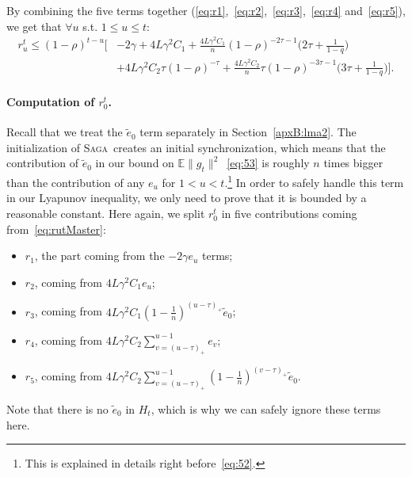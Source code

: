 \documentclass[twoside]{article}
\newcommand{\stepsize}{\gamma}
\newcommand{\overlap}{\tau}
\newcommand{\contraction}{\rho}
\newcommand{\lipschitz}{L}
\newcommand{\E}{\mathbb{E}}
\newcommand{\SAGA}{\textsc{Saga}}
\begin{document}
By combining the five terms together (\eqref{eq:r1},~\eqref{eq:r2},~\eqref{eq:r3},~\eqref{eq:r4} and~\eqref{eq:r5}), we get that $\forall u$ s.t. $1 \leq u \leq t$:
\begin{equation}\label{eq:rut}
\begin{aligned}
r_u^t \leq (1- \contraction)^{t-u} 
	\Big[
		&-2 \stepsize
		+4\lipschitz\stepsize^2 C_1
		+\frac{4\lipschitz\stepsize^2 C_1}{n}
			(1 - \contraction)^{-2\overlap -1} \big(
				2\overlap 
				+ \frac{1}{1-q}
			\big)
\\
		&+4\lipschitz\stepsize^2 C_2 \overlap (1-\contraction)^{-\overlap}
		+\frac{4\lipschitz\stepsize^2 C_2}{n} \overlap (1 -\contraction)^{-3\overlap -1}
			\big(
				3\overlap
				+ \frac{1}{1-q}
		\big)
	\Big] .
\end{aligned}
\end{equation}

\paragraph{Computation of $r_0^t$.}
Recall that we treat the $\tilde e_0$ term separately in Section~\ref{apxB:lma2}.
The initialization of \SAGA\ creates an initial synchronization, which means that the contribution of $\tilde e_0$ in our bound on $\E\|g_t\|^2$~\eqref{eq:53} is roughly $n$ times bigger than the contribution of any $e_u$ for $1 < u < t$.\footnote{This is explained in details right before~\eqref{eq:52}.}
In order to safely handle this term in our Lyapunov inequality, we only need to prove that it is bounded by a reasonable constant.
Here again, we split $r_0^t$ in five contributions coming from~\eqref{eq:rutMaster}:
\begin{itemize}
\item $r_1$, the part coming from the $-2\stepsize e_u$ terms;
\item $r_2$, coming from $4\lipschitz\stepsize^2 C_1 e_u$;
\item $r_3$, coming from $4\lipschitz\stepsize^2 C_1 (1 -\frac{1}{n})^{(u -\overlap)_+} \tilde e_0$;
\item $r_4$, coming from $4\lipschitz\stepsize^2 C_2\sum_{v=(u-\overlap)_+}^{u-1} e_v$;
\item $r_5$, coming from $4\lipschitz\stepsize^2 C_2\sum_{v=(u-\overlap)_+}^{u-1} (1 -\frac{1}{n})^{(v -\overlap)_+} \tilde e_0$.
\end{itemize}
Note that there is no $\tilde e_0$ in $H_t$, which is why we can safely ignore these terms here.
\end{document}
